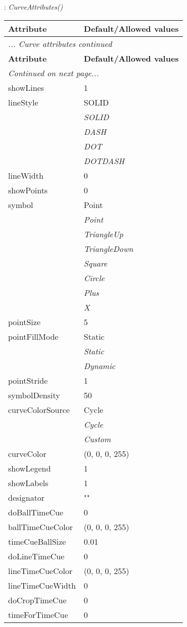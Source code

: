 \documentclass[10pt,a4paper]{report}
\begin{document}
\newpage

{}
: {\it CurveAttributes() }\\[-3mm]

\begin{longtable}{ll}
{\bf Attribute} & {\bf Default/Allowed values} \\
\hline \hline
\endfirsthead
\multicolumn{2}{l}{{\it ... Curve attributes continued}} \\
{\bf Attribute} & {\bf Default/Allowed values} \\
\hline \hline
\endhead
\hline
\multicolumn{2}{l}{{\it Continued on next page...}} \\
\endfoot
\hline
\endlastfoot

showLines  &  1 \\
lineStyle  &  SOLID   \\
 & {\it  SOLID} \\
 & {\it  DASH} \\
 & {\it  DOT} \\
 & {\it  DOTDASH} \\
lineWidth  &  0 \\
showPoints  &  0 \\
symbol  &  Point   \\
 & {\it  Point} \\
 & {\it  TriangleUp} \\
 & {\it  TriangleDown} \\
 & {\it  Square} \\
 & {\it  Circle} \\
 & {\it  Plus} \\
 & {\it  X} \\
pointSize  &  5 \\
pointFillMode  &  Static   \\
 & {\it  Static} \\
 & {\it  Dynamic} \\
pointStride  &  1 \\
symbolDensity  &  50 \\
curveColorSource  &  Cycle   \\
 & {\it  Cycle} \\
 & {\it  Custom} \\
curveColor  &  (0, 0, 0, 255) \\
showLegend  &  1 \\
showLabels  &  1 \\
designator  &  "" \\
doBallTimeCue  &  0 \\
ballTimeCueColor  &  (0, 0, 0, 255) \\
timeCueBallSize  &  0.01 \\
doLineTimeCue  &  0 \\
lineTimeCueColor  &  (0, 0, 0, 255) \\
lineTimeCueWidth  &  0 \\
doCropTimeCue  &  0 \\
timeForTimeCue  &  0 \\
\end{longtable}
\end{document}
